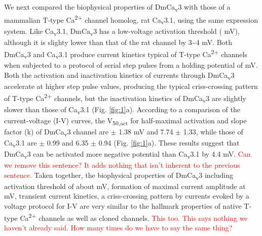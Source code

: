 We next compared the biophysical properties of DmCa\textsubscript{v}3 with those of a mammalian T-type Ca\textsuperscript{2+} channel homolog, rat Ca\textsubscript{v}3.1\cite{PerezReyes:1998gn}, using the same expression system.
Like Ca\textsubscript{v}3.1, DmCa\textsubscript{v}3 has a low-voltage activation threshold ( mV), although it is slighty lower than that of the rat channel by 3\sim 4 mV.
Both DmCa\textsubscript{v}3 and Ca\textsubscript{v}3.1 produce current kinetics typical of T-type Ca\textsuperscript{2+} channels when subjected to a protocol of serial step pulses from a holding potential of  mV.
Both the activation and inactivation kinetics of currents through DmCa\textsubscript{v}3 accelerate at higher step pulse values, producing the typical criss-crossing pattern of T-type Ca\textsuperscript{2+} channels, but the inactivation kinetics of DmCa\textsubscript{v}3 are slightly slower than those of Ca\textsubscript{v}3.1 (Fig. \ref{fig:1}a).
According to a comparison of the  current-voltage (I-V) curves, the V\textsubscript{50,act} for half-maximal activation and slope factor (k) of DmCa\textsubscript{v}3 channel are  $\pm$ 1.38 mV and 7.74 $\pm$ 1.33, while those of Ca\textsubscript{v}3.1 are  $\pm$ 0.99 and 6.35 $\pm$ 0.94 (Fig. \ref{fig:1}a).
These results suggest that DmCa\textsubscript{v}3 can be activated more negative potential than Ca\textsubscript{v}3.1 by 4.4 mV. \textcolor{red}{Can we remove this sentence? It adds nothing that isn't inherent to the previous sentence.}
Taken together, the biophysical properties of DmCa\textsubscript{v}3 including activation threshold of about  mV, formation of maximal current amplitude at  mV, transient current kinetics, a criss-crossing pattern by currents evoked by a voltage protocol for I-V are very similar to the hallmark properties of native T-type Ca\textsuperscript{2+} channels as well as cloned channels\cite{PerezReyes:1998gn,carbone:1984aa,Cribbs:1998vc,lee:1999aa}. \textcolor{red}{This too. This says nothing we haven't already said. How many times do we have to say the same thing?}

